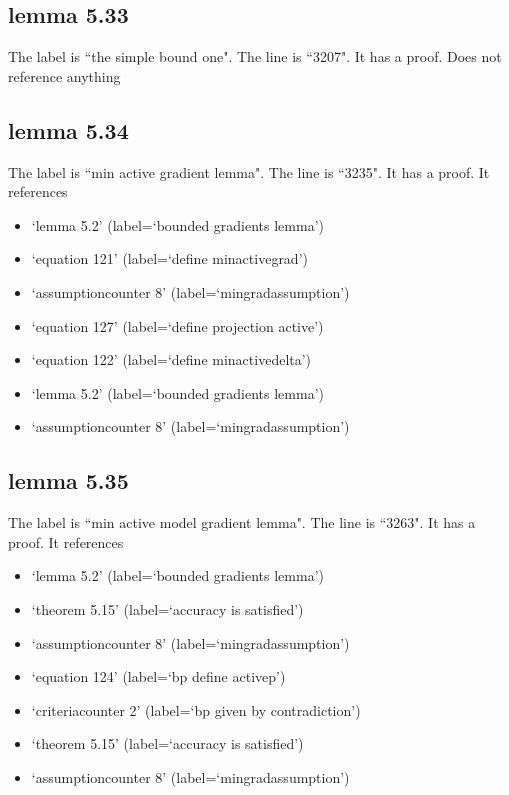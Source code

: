 \documentclass{article}
\begin{document}
\subsection{lemma 5.33}
The label is ``the simple bound one".
The line is ``3207".
It has a proof.
Does not reference anything
\subsection{lemma 5.34}
The label is ``min active gradient lemma".
The line is ``3235".
It has a proof.
It references \begin{itemize}
\item `lemma 5.2' (label=`bounded gradients lemma')
\item `equation 121' (label=`define minactivegrad')
\item `assumptioncounter 8' (label=`mingradassumption')
\item `equation 127' (label=`define projection active')
\item `equation 122' (label=`define minactivedelta')
\item `lemma 5.2' (label=`bounded gradients lemma')
\item `assumptioncounter 8' (label=`mingradassumption')
\end{itemize}
\subsection{lemma 5.35}
The label is ``min active model gradient lemma".
The line is ``3263".
It has a proof.
It references \begin{itemize}
\item `lemma 5.2' (label=`bounded gradients lemma')
\item `theorem 5.15' (label=`accuracy is satisfied')
\item `assumptioncounter 8' (label=`mingradassumption')
\item `equation 124' (label=`bp define activep')
\item `criteriacounter 2' (label=`bp given by contradiction')
\item `theorem 5.15' (label=`accuracy is satisfied')
\item `assumptioncounter 8' (label=`mingradassumption')
\end{itemize}
\end{document}
